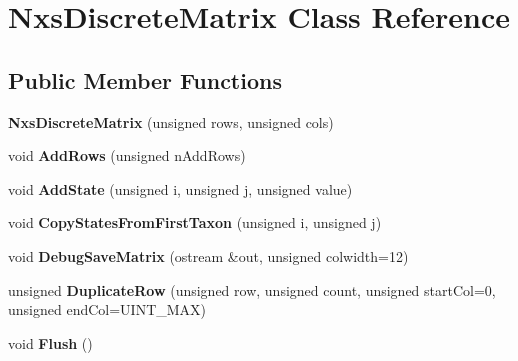 \hypertarget{classNxsDiscreteMatrix}{
\section{NxsDiscreteMatrix Class Reference}
\label{classNxsDiscreteMatrix}
}
\subsection*{Public Member Functions}
\begin{DoxyCompactItemize}
\item 
\hypertarget{classNxsDiscreteMatrix_a537a120d005714989645805bb946a184}{
{\bfseries NxsDiscreteMatrix} (unsigned rows, unsigned cols)}
\label{classNxsDiscreteMatrix_a537a120d005714989645805bb946a184}

\item 
\hypertarget{classNxsDiscreteMatrix_a17c807f6229f13f93bd50b86726911be}{
void {\bfseries AddRows} (unsigned nAddRows)}
\label{classNxsDiscreteMatrix_a17c807f6229f13f93bd50b86726911be}

\item 
\hypertarget{classNxsDiscreteMatrix_aa748836bfeeaf4d91567539a5f06297b}{
void {\bfseries AddState} (unsigned i, unsigned j, unsigned value)}
\label{classNxsDiscreteMatrix_aa748836bfeeaf4d91567539a5f06297b}

\item 
\hypertarget{classNxsDiscreteMatrix_a9c833ce4c0f7770401014141bf0afad3}{
void {\bfseries CopyStatesFromFirstTaxon} (unsigned i, unsigned j)}
\label{classNxsDiscreteMatrix_a9c833ce4c0f7770401014141bf0afad3}

\item 
\hypertarget{classNxsDiscreteMatrix_a25211235186f83196e719a983673c5f1}{
void {\bfseries DebugSaveMatrix} (ostream \&out, unsigned colwidth=12)}
\label{classNxsDiscreteMatrix_a25211235186f83196e719a983673c5f1}

\item 
\hypertarget{classNxsDiscreteMatrix_aa521f18e6fc030122599c227644e9a4d}{
unsigned {\bfseries DuplicateRow} (unsigned row, unsigned count, unsigned startCol=0, unsigned endCol=UINT\_\-MAX)}
\label{classNxsDiscreteMatrix_aa521f18e6fc030122599c227644e9a4d}

\item 
\hypertarget{classNxsDiscreteMatrix_a89da8bcc568a9fa8b57a3c40453b8287}{
void {\bfseries Flush} ()}
\label{classNxsDiscreteMatrix_a89da8bcc568a9fa8b57a3c40453b8287}


\end{DoxyCompactItemize}
